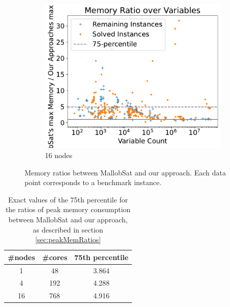 \documentclass[12pt,a4paper,twoside]{scrartcl}
\numberwithin{equation}{section}
\begin{document}
\begin{figure}[!h]
  \begin{subfigure}[c]{.45\textwidth}
    \center
    \includegraphics[scale=.45]{plots/16node_compare/mem_ratio_over_vars.pdf}
    \caption{16 nodes}
    \label{fig:memRatiosVars16node}
  \end{subfigure}
  \caption{Memory ratios between MallobSat and our approach. Each data point corresponds to a benchmark instance.}
  \label{fig:memRatiosVars}
\end{figure}

\begin{table}[!h]
  \center
  \begin{tabular}{ ccc }
    \toprule
    \#nodes & \#cores & 75th percentile \\
    \midrule
    1  & 48  & 3.864\\
    4  & 192 & 4.288\\
    16 & 768 & 4.916\\
    \bottomrule
  \end{tabular}
  \caption{Exact values of the 75th percentile for the ratios of peak memory consumption between MallobSat and our approach, as described in section \ref{sec:peakMemRatios}}
  \label{tab:memRatioPercentiles}
\end{table}
\end{document}

